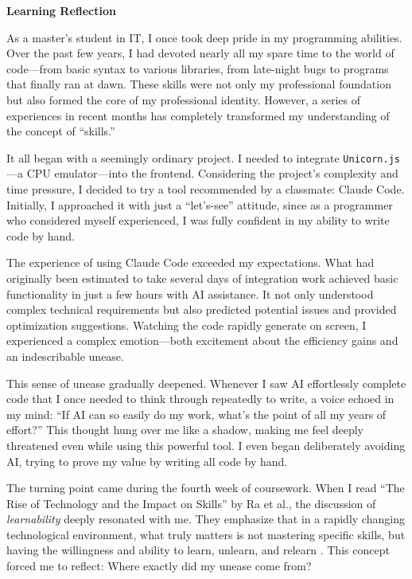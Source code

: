 \documentclass[12pt,a4paper]{article}
\begin{document}
\begin{center}
\textbf{\LARGE Learning Reflection}
\end{center}

\vspace{0.5cm}

As a master's student in IT, I once took deep pride in my programming abilities. Over the past few years, I had devoted nearly all my spare time to the world of code---from basic syntax to various libraries, from late-night bugs to programs that finally ran at dawn. These skills were not only my professional foundation but also formed the core of my professional identity. However, a series of experiences in recent months has completely transformed my understanding of the concept of ``skills.'' 

It all began with a seemingly ordinary project. I needed to integrate \texttt{Unicorn.js}---a CPU emulator---into the frontend. Considering the project's complexity and time pressure, I decided to try a tool recommended by a classmate: Claude Code. Initially, I approached it with just a ``let's-see'' attitude, since as a programmer who considered myself experienced, I was fully confident in my ability to write code by hand.

The experience of using Claude Code exceeded my expectations. What had originally been estimated to take several days of integration work achieved basic functionality in just a few hours with AI assistance. It not only understood complex technical requirements but also predicted potential issues and provided optimization suggestions. Watching the code rapidly generate on screen, I experienced a complex emotion---both excitement about the efficiency gains and an indescribable unease.

This sense of unease gradually deepened. Whenever I saw AI effortlessly complete code that I once needed to think through repeatedly to write, a voice echoed in my mind: ``If AI can so easily do my work, what's the point of all my years of effort?'' This thought hung over me like a shadow, making me feel deeply threatened even while using this powerful tool. I even began deliberately avoiding AI, trying to prove my value by writing all code by hand.

The turning point came during the fourth week of coursework. When I read ``The Rise of Technology and the Impact on Skills'' by Ra et al., the discussion of \emph{learnability} deeply resonated with me. They emphasize that in a rapidly changing technological environment, what truly matters is not mastering specific skills, but having the willingness and ability to learn, unlearn, and relearn \citep{ra2019technology}. This concept forced me to reflect: Where exactly did my unease come from?
\end{document}

